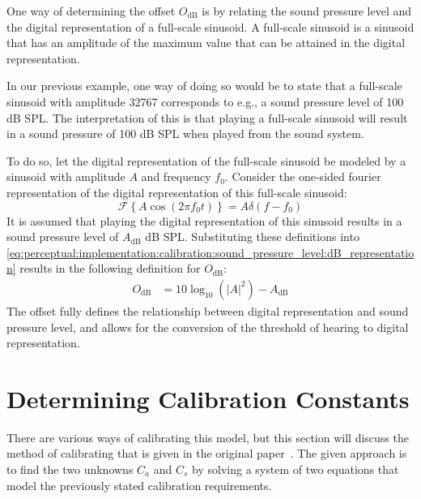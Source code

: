 One way of determining the offset $O_\text{dB}$ is by relating the sound pressure level and the digital representation of a full-scale sinusoid.
A full-scale sinusoid is a sinusoid that has an amplitude of the maximum value that can be attained in the digital representation.

In our previous example, one way of doing so would be to state that a full-scale sinusoid with amplitude 32767 corresponds to 
e.g., a sound pressure level of 100 dB SPL.
The interpretation of this is that playing a full-scale sinusoid will result in a sound pressure of 100 dB SPL when played from the sound system.

To do so, let the digital representation of the full-scale sinusoid be modeled by a sinusoid with amplitude $A$ and frequency $f_0$.
Consider the one-sided fourier representation of the digital representation of this full-scale sinusoid: 
\begin{equation}
    \mathcal{F}\left\{A\cos\left(2\pi f_0 t\right)\right\} = A\delta\left(f - f_0\right)
\end{equation}
It is assumed that playing the digital representation of this sinusoid results in a sound pressure level of $A_\text{dB}$ dB SPL. 
Substituting these definitions into \autoref{eq:perceptual:implementation:calibration:sound_pressure_level:dB_representation} 
results in the following definition for $O_\text{dB}$: 
\begin{align}
    O_\text{dB} &= 10\log_{10}\left(\left|A\right|^2\right) - A_\text{dB} 
\end{align}
The offset fully defines the relationship between digital representation and sound pressure level, and allows for the conversion of the threshold of hearing
to digital representation.

\section{Determining Calibration Constants}
\label{ch:perceptual:implementation:calibration:coefficients}
There are various ways of calibrating this model, but this section will discuss the method of calibrating 
that is given in the original paper~\cite{van2005perceptual}.
The given approach is to find the two unknowns $C_a$ and $C_s$ by solving a system of two equations that model the previously stated calibration requirements.

